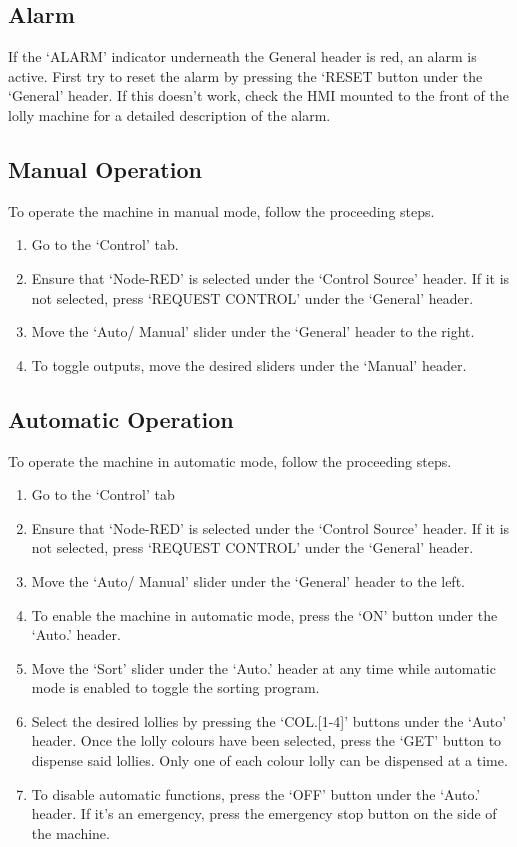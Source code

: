     \subsection{Alarm}
        If the `ALARM' indicator underneath the General header is red, an alarm is active. First try to reset the alarm by pressing the `RESET button under the `General' header. If this doesn't work, check the HMI mounted to the front of the lolly machine for a detailed description of the alarm.
    
    \subsection{Manual Operation}
            To operate the machine in manual mode, follow the proceeding steps. 
            \begin{enumerate}
                \item Go to the `Control' tab.
                \item Ensure that `Node-RED' is selected under the `Control Source' header. If it is not selected, press `REQUEST CONTROL' under the `General' header. 
                \item Move the `Auto/ Manual' slider under the `General' header to the right.
                \item To toggle outputs, move the desired sliders under the `Manual' header.
            \end{enumerate}

        \subsection{Automatic Operation}
            To operate the machine in automatic mode, follow the proceeding steps. 
            \begin{enumerate}
                \item Go to the `Control' tab
                \item Ensure that `Node-RED' is selected under the `Control Source' header. If it is not selected, press `REQUEST CONTROL' under the `General' header. 
                \item Move the `Auto/ Manual' slider under the `General' header to the left.
                \item To enable the machine in automatic mode, press the `ON' button under the `Auto.' header. 
                \item Move the `Sort' slider under the `Auto.' header at any time while automatic mode is enabled to toggle the sorting program.
                \item Select the desired lollies by pressing the `COL.[1-4]' buttons under the `Auto' header. Once the lolly colours have been selected, press the ‘GET’ button to dispense said lollies. Only one of each colour lolly can be dispensed at a time.
                \item To disable automatic functions, press the `OFF' button under the `Auto.' header. If it's an emergency, press the emergency stop button on the side of the machine.
            \end{enumerate}

